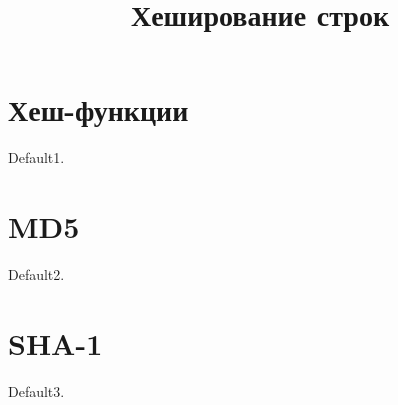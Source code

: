 \documentclass[a4paper, 12pt, oneside]{scrartcl}
\title{Хеширование строк}
\author{}
\date{}
\begin{document}
    \maketitle
    \section{Хеш-функции}\label{sec:section1}
    Default1.~\cite{managementsystem}

    \section{MD5}\label{sec:section2}
    Default2.
    \section{SHA-1}\label{sec:section3}
    Default3.
    
    
\end{document}
